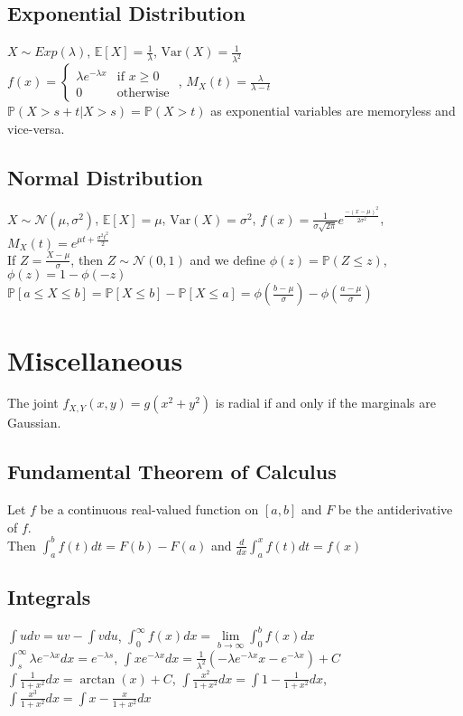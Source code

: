 \documentclass{article}
\renewcommand{\P}{\mathbb{P}}
\newcommand{\E}{\mathbb{E}}
\newcommand{\V}{\mbox{Var}}
\begin{document}
\subsection{Exponential Distribution}
$X\sim Exp(\lambda)$, $\E[X] = \frac{1}{\lambda}$, $\V(X) = \frac{1}{\lambda^2}$ \\
$f(x) = \begin{cases} \lambda e^{-\lambda x} & \text{if } x \geq 0 \\ 
0 & \text{otherwise} \end{cases}$ , $M_X(t) = \frac{\lambda}{\lambda - t}$ \\
$\P(X > s + t | X > s) = \P(X > t)$ as exponential variables are memoryless and vice-versa.

\subsection{Normal Distribution}
$X\sim \mathcal{N}(\mu, \sigma^2)$, $\E[X] = \mu$, $\V(X) = \sigma^2$, $f(x)=\frac{1}{\sigma \sqrt{2\pi}}e^{\frac{-(x-\mu)^2}{2\sigma^2}}$, $M_X(t) = e^{\mu t + \frac{\sigma^2 t^2}{2}}$\\
If $Z = \frac{X-\mu}{\sigma}$, then $Z\sim \mathcal{N}(0, 1)$ and we define $\phi(z) = \P(Z \leq z)$, $\phi(z) = 1-\phi(-z)$\\
$\P[a\leq X \leq b] = \P[X \leq b] - \P[X \leq a] = \phi(\frac{b-\mu}{\sigma}) - \phi(\frac{a-\mu}{\sigma})$ 


\section{Miscellaneous}
The joint $f_{X,Y}(x,y) = g(x^2 + y^2)$ is radial if and only if the marginals are Gaussian. 

\subsection{Fundamental Theorem of Calculus}
Let $f$ be a continuous real-valued function on $[a, b]$ and $F$ be the antiderivative of $f$. \\
Then $\int_a^b f(t) dt = F(b) - F(a)$ and $\frac{d}{dx}\int_a^x f(t)dt = f(x)$ 
\subsection{Integrals}
$\int udv = uv - \int vdu$, $\int_0^{\infty}f(x)dx = \lim\limits_{b\to\infty}\int_0^bf(x)dx$ \\
$\int_{s}^{\infty}\lambda e^{-\lambda x}dx = e^{-\lambda s}$, $\int xe^{-\lambda x}dx = \frac{1}{\lambda^2}(-\lambda e^{-\lambda x}x -e^{-\lambda x}) + C$ \\
$\int \frac{1}{1+x^2}dx = \arctan(x) + C$, $\int \frac{x^2}{1+x^2} dx = \int 1 - \frac{1}{1+x^2}dx$, $\int \frac{x^3}{1+x^2} dx = \int x - \frac{x}{1+x^2}dx$ 
\end{document}
